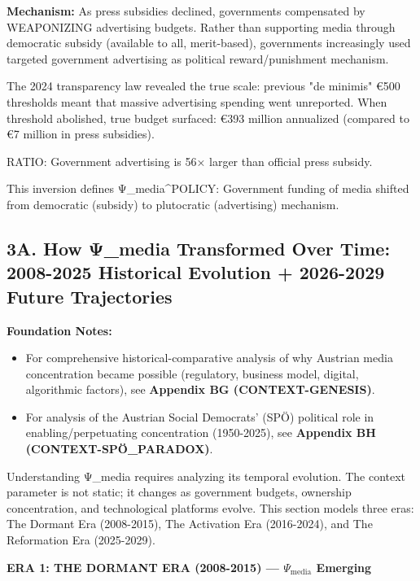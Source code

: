 \textbf{Mechanism:} As press subsidies declined, governments compensated by
WEAPONIZING advertising budgets. Rather than supporting media through democratic
subsidy (available to all, merit-based), governments increasingly used targeted
government advertising as political reward/punishment mechanism.

The 2024 transparency law revealed the true scale: previous "de minimis" €500
thresholds meant that massive advertising spending went unreported. When threshold
abolished, true budget surfaced: €393 million annualized (compared to €7 million
in press subsidies).

RATIO: Government advertising is 56× larger than official press subsidy.

This inversion defines Ψ\_media^{POLICY}: Government funding of media shifted
from democratic (subsidy) to plutocratic (advertising) mechanism.

\label{sec:dx-dynamic-psi-media}

\subsection*{3A. How Ψ_media Transformed Over Time: 2008-2025 Historical Evolution + 2026-2029 Future Trajectories}

\textbf{Foundation Notes:}
\begin{itemize}[nosep]
\item For comprehensive historical-comparative analysis of why Austrian media concentration became possible
  (regulatory, business model, digital, algorithmic factors), see \textbf{Appendix BG (CONTEXT-GENESIS)}.
\item For analysis of the Austrian Social Democrats' (SPÖ) political role in enabling/perpetuating concentration (1950-2025),
  see \textbf{Appendix BH (CONTEXT-SPÖ_PARADOX)}.
\end{itemize}

Understanding Ψ_media requires analyzing its temporal evolution. The context parameter is not static;
it changes as government budgets, ownership concentration, and technological platforms evolve. This
section models three eras: The Dormant Era (2008-2015), The Activation Era (2016-2024), and The
Reformation Era (2025-2029).

\textbf{ERA 1: THE DORMANT ERA (2008-2015) — $\Psi_{\text{media}}$ Emerging}

